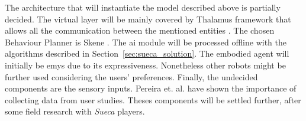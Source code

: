 The architecture that will instantiate the model described above is partially decided.
The virtual layer will be mainly covered by Thalamus framework that allows all the communication between the mentioned entities \cite{Ribeiro}.
The chosen Behaviour Planner is Skene \cite{Ribeiroa}.
The \gls{ai} module will be processed offline with the algorithms described in Section~\ref{sec:sueca_solution}.
The embodied agent will initially be \gls{emys} due to its expressiveness.
Nonetheless other robots might be further used considering the users' preferences.
Finally, the undecided components are the sensory inputs.
Pereira et. al. have shown the importance of collecting data from user studies.
Theses components will be settled further, after some field research with \emph{Sueca} players.









